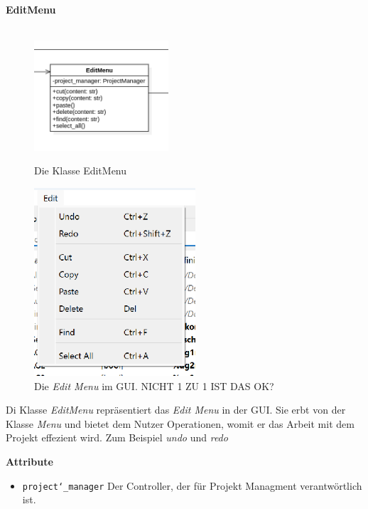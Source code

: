 \documentclass{article}
\begin{document}
\newpage
\textbf{\large{EditMenu}}\\\\
\begin{figure}[H]%
    \centering
    \begin{minipage}[b]{0.4\textwidth}
        \includegraphics[width=5cm]{entwurf/Entwurf_dokument/img/Alissa/EditMenu.png}
        \caption{Die Klasse EditMenu}
    \end{minipage}
    \hfill
    \begin{minipage}[b]{0.4\textwidth}
        \includegraphics[width=6cm]{entwurf/Entwurf_dokument/img/Alissa/FileMenuGUI.png} %
        \caption{Die \textit{Edit Menu} im GUI. NICHT 1 ZU 1 IST DAS OK?}
    \end{minipage}
\end{figure}
Di Klasse \textit{EditMenu} repräsentiert das \textit{Edit Menu} in der GUI. Sie erbt von der Klasse \textit{Menu} und bietet dem Nutzer Operationen, womit er das Arbeit mit dem Projekt effezient wird. Zum Beispiel \textit{undo} und \textit{redo}
\newline \newline

\textbf{{Attribute}}
\begin{itemize}
\item \texttt{project\char`_manager} \newline Der Controller, der für Projekt Managment verantwörtlich ist.
\end{itemize}
\end{document}
